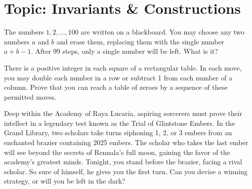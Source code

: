 

\DeclareRobustCommand{\stirling}{\genfrac\{\}{0pt}{}}
\setcounter{secnumdepth}{0} 

\newcommand{\weekNum}{8} %
\newcommand{\meetingDate}{Mar 12, 2025} 


\pagestyle{empty}
\sloppy
\maketitle

\section{Topic: Invariants \& Constructions}

\begin{problem}
    The numbers $1, 2, \ldots , 100$ are written on a blackboard. You may choose any two numbers $a$ and $b$ and erase them, replacing them with the single number $a + b - 1$. After 99 steps, only a single number will be left. What is it?
\end{problem}

\begin{problem}[C][3][Engel]
    There is a positive integer in each square of a rectangular table. In each move, you may double each number in a row or subtract 1 from each number of a column. Prove that you can reach a table of zeroes by a sequence of these permitted moves.
\end{problem}

\begin{problem}
    Deep within the Academy of Raya Lucaria, aspiring sorcerers must prove their intellect in a legendary test known as the Trial of Glintstone Embers. In the Grand Library, two scholars take turns siphoning 1, 2, or 3 embers from an enchanted brazier containing 2025 embers. The scholar who takes the last ember will see beyond the secrets of Rennala’s full moon, gaining the favor of the academy’s greatest minds. Tonight, you stand before the brazier, facing a rival scholar. So sure of himself, he gives you the first turn. Can you devise a winning strategy, or will you be left in the dark?
\end{problem}

